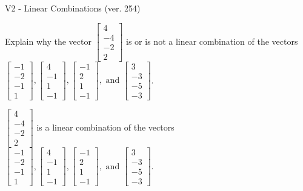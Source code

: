 \begin{exercise}
  \begin{exerciseTitle}V2 - Linear Combinations (ver. 254)\end{exerciseTitle}
  \begin{exerciseStatement}
    Explain why the vector \(\left[\begin{array}{c}
4 \\
-4 \\
-2 \\
2
\end{array}\right]\)  is or is not a linear 
	combination of the vectors \(\left[\begin{array}{c}
-1 \\
-2 \\
-1 \\
1
\end{array}\right] , \left[\begin{array}{c}
4 \\
-1 \\
1 \\
-1
\end{array}\right] , \left[\begin{array}{c}
-1 \\
2 \\
1 \\
-1
\end{array}\right] , \text{ and } \left[\begin{array}{c}
3 \\
-3 \\
-5 \\
-3
\end{array}\right]\).
	


  \end{exerciseStatement}
  \begin{exerciseAnswer}
   \(\left[\begin{array}{c}
4 \\
-4 \\
-2 \\
2
\end{array}\right]\) 
  	 is  
	a linear combination of the vectors \(\left[\begin{array}{c}
-1 \\
-2 \\
-1 \\
1
\end{array}\right] , \left[\begin{array}{c}
4 \\
-1 \\
1 \\
-1
\end{array}\right] , \left[\begin{array}{c}
-1 \\
2 \\
1 \\
-1
\end{array}\right] , \text{ and } \left[\begin{array}{c}
3 \\
-3 \\
-5 \\
-3
\end{array}\right]\).


\end{exerciseAnswer}
\end{exercise}
